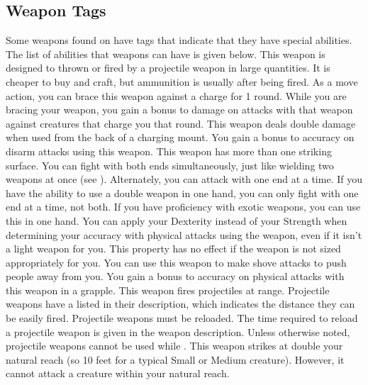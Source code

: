     \subsection{Weapon Tags}
        Some weapons found on  have tags that indicate that they have special abilities. The list of abilities that weapons can have is given below.
         This weapon is designed to thrown or fired by a projectile weapon in large quantities. It is cheaper to buy and craft, but ammunition is usually  after being fired.
         As a move action, you can brace this weapon against a charge for 1 round. While you are bracing your weapon, you gain a  bonus to damage on attacks with that weapon against creatures that charge you that round.
         This weapon deals double damage when used from the back of a charging mount.
         You gain a  bonus to accuracy on disarm attacks using this weapon.
         This weapon has more than one striking surface. You can fight with both ends simultaneously, just like wielding two weapons at once (see ). Alternately, you can attack with one end at a time. If you have the ability to use a double weapon in one hand, you can only fight with one end at a time, not both.
         If you have proficiency with exotic weapons, you can use this in one hand.
         You can apply your Dexterity instead of your Strength when determining your accuracy with physical attacks using the weapon, even if it isn't a light weapon for you.
        This property has no effect if the weapon is not sized appropriately for you.
         You can use this weapon to make shove attacks to push people away from you. %
         You gain a  bonus to accuracy on physical attacks with this weapon in a grapple.
         This weapon fires projectiles at range. Projectile weapons have a  listed in their description, which indicates the distance they can be easily fired. Projectile weapons must be reloaded. The time required to reload a projectile weapon is given in the weapon description.
        Unless otherwise noted, projectile weapons cannot be used while \prone.
        \label{Reach Weapon} This weapon strikes at double your natural reach (so 10 feet for a typical Small or Medium creature). However, it cannot attack a creature within your natural reach.

